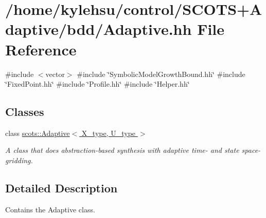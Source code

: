 \hypertarget{Adaptive_8hh}{}\section{/home/kylehsu/control/\+S\+C\+O\+T\+S+\+Adaptive/bdd/\+Adaptive.hh File Reference}
\label{Adaptive_8hh}
{\ttfamily \#include $<$vector$>$}\newline
{\ttfamily \#include \char`\"{}Symbolic\+Model\+Growth\+Bound.\+hh\char`\"{}}\newline
{\ttfamily \#include \char`\"{}Fixed\+Point.\+hh\char`\"{}}\newline
{\ttfamily \#include \char`\"{}Profile.\+hh\char`\"{}}\newline
{\ttfamily \#include \char`\"{}Helper.\+hh\char`\"{}}\newline
\subsection*{Classes}
\begin{DoxyCompactItemize}
\item 
class \hyperlink{classscots_1_1Adaptive}{scots\+::\+Adaptive$<$ X\+\_\+type, U\+\_\+type $>$}
\begin{DoxyCompactList}\small\item\em A class that does abstraction-\/based synthesis with adaptive time-\/ and state space-\/gridding. \end{DoxyCompactList}\end{DoxyCompactItemize}


\subsection{Detailed Description}
Contains the Adaptive class. 